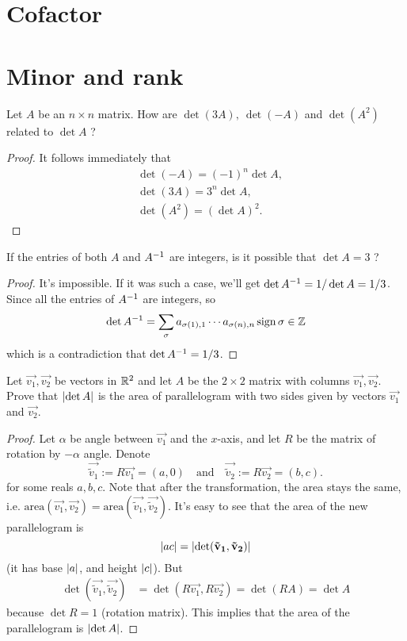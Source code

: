 \section{Cofactor}
\section{Minor and rank}

\setcounter{exercise}{1}
\begin{exercise}
  Let $A$ be an $n\times n$ matrix. How are $\det(3A),~\det(-A)$
  and $\det(A^2)$ related to $\det A$ ?
\end{exercise}
\begin{proof}
  It follows immediately that 
  \begin{align*}
    &\det(-A)=(-1)^n\det A,\\
    &\det(3A)=3^n\det A,\\
    &\det(A^2)=(\det A)^2.
  \end{align*}
\end{proof}
\begin{exercise}
  If the entries of both $A$ and $A^{-1}$ are integers,
  is it possible that $\det A=3$ ?
\end{exercise}
\begin{proof}
  It's impossible. If it was such a case, we'll get 
  $\det A^{-1}=1/\det A=1/3$. Since all the entries of $A^{-1}$ are
  integers, so
  \[
    \det A^{-1}=\sum_{\sigma}a_{\sigma(1),1}\cdots 
    a_{\sigma(n),n}\operatorname{sign}\sigma\in\mathbb Z
  \]
  which is a contradiction that $\det A^{-1}=1/3$.
\end{proof}
\begin{exercise}
  Let $\vec{v_1},\vec{v_2}$ be vectors in $\mathbb R^2$ and let $A$ be the
  $2\times 2$ matrix with columns $\vec{v_1},\vec{v_2}$. Prove that
  $\lvert\det A\rvert$ is the area of parallelogram with two sides given by
  vectors $\vec{v_1}$ and $\vec{v_2}$.
\end{exercise}
\begin{proof}
  Let $\alpha$ be angle between $\vec{v_1}$ and the $x$-axis, and
  let $R$ be the matrix of rotation by $-\alpha$ angle. Denote
  \[
    \vec{\tilde{v}_1}:=R\vec{v_1}=(a,0)\quad\text{and}\quad
    \vec{\tilde{v}_2}:=R\vec{v_2}=(b,c).
  \]
  for some reals $a,b,c$. 
  Note that after the transformation, the area stays the same, i.e.
  $\mathrm{area}(\vec{v_1},\vec{v_2})
  =\mathrm{area}(\vec{\tilde{v}_1},\vec{\tilde{v}_2})$. It's easy 
  to see that the area of the new parallelogram is 
  \[\lvert ac\rvert=\lvert\det (\mathbf{\tilde{v}_1},\mathbf{\tilde{v}_2})\rvert\]
  (it has  base $\lvert a\rvert$, and height $\lvert c\rvert$). But
  \begin{align*}
    \det(\vec{\tilde{v}_1},\vec{\tilde{v}_2})
    &=\det(R\vec{v_1}, R\vec{v_2})=\det(RA)=\det A
  \end{align*}
  because $\det R=1$ (rotation matrix). This implies that the area of
  the parallelogram is $\lvert\det A\rvert$.
\end{proof}
